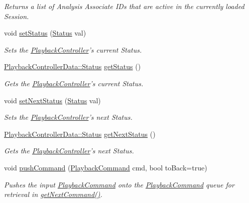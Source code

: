 \begin{DoxyCompactItemize}
\begin{DoxyCompactList}\small\item\em Returns a list of Analysis Associate I\-Ds that are active in the currently loaded Session. \end{DoxyCompactList}\item 
void \hyperlink{class_playback_controller_data_aecbf09ff980c7d286476a1d7c843ce42}{set\-Status} (\hyperlink{class_playback_controller_data_a64757fd28c6f9ab34d438f6c778eaf90}{Status} val)
\begin{DoxyCompactList}\small\item\em Sets the \hyperlink{class_playback_controller}{Playback\-Controller}'s current Status. \end{DoxyCompactList}\item 
\hyperlink{class_playback_controller_data_a64757fd28c6f9ab34d438f6c778eaf90}{Playback\-Controller\-Data\-::\-Status} \hyperlink{class_playback_controller_data_ada62b44e38193afd17af0ac1865457e2}{get\-Status} ()
\begin{DoxyCompactList}\small\item\em Gets the \hyperlink{class_playback_controller}{Playback\-Controller}'s current Status. \end{DoxyCompactList}\item 
void \hyperlink{class_playback_controller_data_a5496514baef37bea5c689a16712b54d6}{set\-Next\-Status} (\hyperlink{class_playback_controller_data_a64757fd28c6f9ab34d438f6c778eaf90}{Status} val)
\begin{DoxyCompactList}\small\item\em Sets the \hyperlink{class_playback_controller}{Playback\-Controller}'s next Status. \end{DoxyCompactList}\item 
\hyperlink{class_playback_controller_data_a64757fd28c6f9ab34d438f6c778eaf90}{Playback\-Controller\-Data\-::\-Status} \hyperlink{class_playback_controller_data_a51dbbfbe64bd0cbdb603b6083ad6df8f}{get\-Next\-Status} ()
\begin{DoxyCompactList}\small\item\em Gets the \hyperlink{class_playback_controller}{Playback\-Controller}'s next Status. \end{DoxyCompactList}\item 
void \hyperlink{class_playback_controller_data_a2d95d7188e28b625d5c3039fbc0060d3}{push\-Command} (\hyperlink{struct_playback_command}{Playback\-Command} cmd, bool to\-Back=true)
\begin{DoxyCompactList}\small\item\em Pushes the input \hyperlink{struct_playback_command}{Playback\-Command} onto the \hyperlink{struct_playback_command}{Playback\-Command} queue for retrieval in \hyperlink{class_playback_controller_data_a29956a96a606909177487993b8d03b86}{get\-Next\-Command()}. \end{DoxyCompactList}\item 

\end{DoxyCompactItemize}
